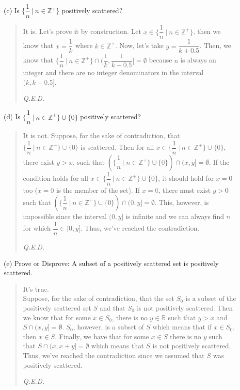 \documentclass[12pt, a4paper]{article}                      %
\begin{document}
\begin{itemize}
\begin{itemize}
\item[]

\item[(c)]
Is $\{\dfrac{1}{n} \ | \ n \in \mathbb{Z}^+\}$ positively scattered?
\begin{quote}
It is. Let's prove it by construction. Let $x \in \{\dfrac{1}{n} \ | \ n \in \mathbb{Z}^+\}$, then
we know that $x = \dfrac{1}{k}$ where $k \in \mathbb{Z}^+$. Now, let's take $y = \dfrac{1}{k + 0.5}$.
Then, we know that $\{\dfrac{1}{n} \ | \ n \in \mathbb{Z}^+\} \cap (\dfrac{1}{k}, \dfrac{1}{k + 0.5}] = \emptyset$
because $n$ is always an integer and there are no integer denominators in the interval $(k, k + 0.5]$.
\begin{flushright}
\textit{Q.E.D.}
\end{flushright}
\end{quote}

\item[]

\item[(d)]
Is $\{\dfrac{1}{n} \ | \ n \in \mathbb{Z}^+\} \cup \{0\}$ positively scattered? 
\begin{quote}
It is not. Suppose, for the sake of contradiction, that $\{\dfrac{1}{n} \ | \ n \in \mathbb{Z}^+\} \cup \{0\}$
is scattered. Then for all $x \in \{\dfrac{1}{n} \ | \ n \in \mathbb{Z}^+\} \cup \{0\}$, there exist
$y > x$, such that $(\{\dfrac{1}{n} \ | \ n \in \mathbb{Z}^+\} \cup \{0\}) \cap (x,y] = \emptyset$.
If the condition holds for all $x \in \{\dfrac{1}{n} \ | \ n \in \mathbb{Z}^+\} \cup \{0\}$, it should hold
for $x = 0$ too ($x = 0$ is the member of the set).
If $x = 0$, there must exist $y > 0$ such that $(\{\dfrac{1}{n} \ | \ n \in \mathbb{Z}^+\} \cup \{0\}) \cap (0,y] = \emptyset$.
This, however, is impossible since the interval $(0, y]$ is infinite and we can always find $n$ for which
$\dfrac{1}{n} \in (0, y]$. Thus, we've reached the contradiction.
\begin{flushright}
\textit{Q.E.D.}
\end{flushright}
\end{quote}

\item[]

\item[(e)]
Prove or Disprove: A subset of a positively scattered set is positively scattered.
\begin{quote}
It's true.\\
Suppose, for the sake of contradiction, that the set $S_0$ is a subset of the positively
scattered set $S$ and that $S_0$ is not positively scattered. Then we know that for some
$x \in S_0$, there is no $y \in \mathbb{R}$ such that $y > x$ and $S \cap (x, y] = \emptyset$.
$S_0$, however, is a subset of $S$ which means that if $x \in S_0$, then $x \in S$. Finally, we have
that for some $x \in S$ there is no $y$ such that $S \cap (x, x + y] = \emptyset$
which means that $S$ is not positively scattered. Thus, we've reached the contradiction since we
assumed that $S$ was positively scattered.
\begin{flushright}
\textit{Q.E.D.}
\end{flushright}
\end{quote}


\end{itemize}
\end{itemize}
\end{document}
